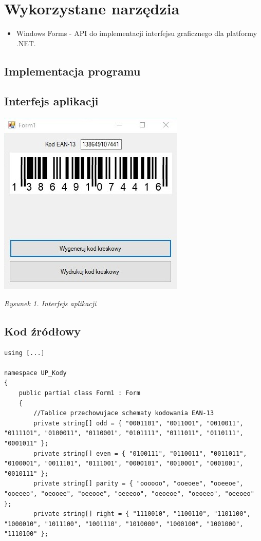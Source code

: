 \documentclass[12pt,a4paper,notitlepage]{report}
\begin{document}
\section{Wykorzystane narzędzia}
\begin{itemize}
\item Windows Forms - API do implementacji interfejsu graficznego dla platformy .NET.
\end{itemize}
\begin{adjustwidth}{0pt}{-50pt}
\section{Implementacja programu}
\subsection{Interfejs aplikacji}
\begin{center}
\noindent \includegraphics[scale=0.85]{okno}
\\
\begin{normalsize}
\textit{Rysunek 1. Interfejs aplikacji}
\end{normalsize}
\end{center}
\newpage
\subsection{Kod źródłowy}
\begin{lstlisting}
using [...]

namespace UP_Kody
{
    public partial class Form1 : Form
    {
    	//Tablice przechowujace schematy kodowania EAN-13
        private string[] odd = { "0001101", "0011001", "0010011", "0111101", "0100011", "0110001", "0101111", "0111011", "0110111", "0001011" };
        private string[] even = { "0100111", "0110011", "0011011", "0100001", "0011101", "0111001", "0000101", "0010001", "0001001", "0010111" };
        private string[] parity = { "oooooo", "ooeoee", "ooeeoe", "ooeeeo", "oeooee", "oeeooe", "oeeeoo", "oeoeoe", "oeoeeo", "oeeoeo" };
        private string[] right = { "1110010", "1100110", "1101100", "1000010", "1011100", "1001110", "1010000", "1000100", "1001000", "1110100" };


\end{lstlisting}
\end{adjustwidth}
\end{document}

